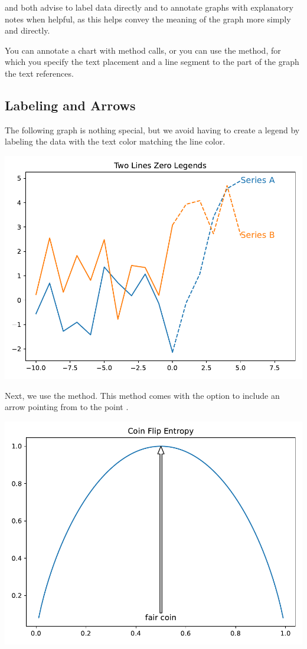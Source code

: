 \cite{knaflic2015storytelling} and \cite{schwabish2021better} both advise to label data directly and to annotate graphs with explanatory notes when helpful, as this helps convey the meaning of the graph more simply and directly. 

You can annotate a chart with  method calls, or you can use the  method, for which you specify the text placement and a line segment to the part of the graph the text references. 


\subsection{Labeling and Arrows}

The following graph is nothing special, but we avoid having to create a legend by labeling the data with the text color matching the line color. 


\begin{center}
    \includegraphics[width = .7\textwidth]{figures/proseplots/label-data.pdf}
\end{center}


Next, we use the  method. This method comes with the option to include an arrow pointing from  to the point . 


\begin{center}
    \includegraphics[width = .7\textwidth]{figures/proseplots/annotate-arrow.pdf}
\end{center}


